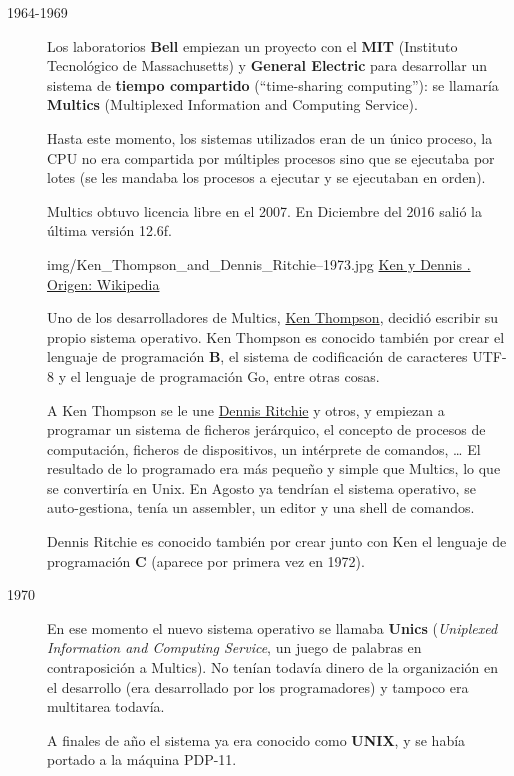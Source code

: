 \documentclass{../../../yukibook.cls/yukibook}
\begin{document}
\begin{description}
\item[1964-1969]Los laboratorios \textbf{Bell} empiezan un proyecto con el \textbf{MIT} (Instituto Tecnológico de Massachusetts) y \textbf{General Electric} para desarrollar un sistema de \textbf{tiempo compartido} (“time-sharing computing”): se llamaría \textbf{Multics} (Multiplexed Information and Computing Service).

Hasta este momento, los sistemas utilizados eran de un único proceso, la CPU no era compartida por múltiples procesos sino que se ejecutaba por lotes (se les mandaba los procesos a ejecutar y se ejecutaban en orden).

Multics obtuvo licencia libre en el 2007. En Diciembre del 2016 salió la última versión 12.6f.

  {img/Ken_Thompson_and_Dennis_Ritchie--1973.jpg}
  {\href{https://en.wikipedia.org/wiki/Ken_Thompson}{Ken y Dennis . Origen: Wikipedia}}
  {
  Uno de los desarrolladores de Multics, \href{https://en.wikipedia.org/wiki/Ken_Thompson}{Ken Thompson}, decidió escribir su propio sistema operativo. Ken Thompson es conocido también por crear el lenguaje de programación \textbf{B}, el sistema de codificación de caracteres UTF-8 y el lenguaje de programación Go, entre otras cosas.

A Ken Thompson se le une \href{https://en.wikipedia.org/wiki/Dennis_Ritchie}{Dennis Ritchie} y otros, y empiezan a programar un sistema de ficheros jerárquico, el concepto de procesos de computación, ficheros de dispositivos, un intérprete de comandos, … El resultado de lo programado era más pequeño y simple que Multics, lo que se convertiría en Unix. En Agosto ya tendrían el sistema operativo, se auto-gestiona,  tenía un assembler, un editor y una shell de comandos.

Dennis Ritchie es conocido también por crear junto con Ken el lenguaje de programación \textbf{C} (aparece por primera vez en 1972).
}


\item[1970]En ese momento el nuevo sistema operativo se llamaba \textbf{Unics} (\textit{Uniplexed Information and Computing Service}, un juego de palabras en contraposición a  Multics). No tenían todavía dinero de la organización en el desarrollo (era desarrollado por los programadores) y tampoco era multitarea todavía.

A finales de año el sistema ya era conocido como \textbf{UNIX}, y se había portado a la máquina PDP-11.


\end{description}
\end{document}
